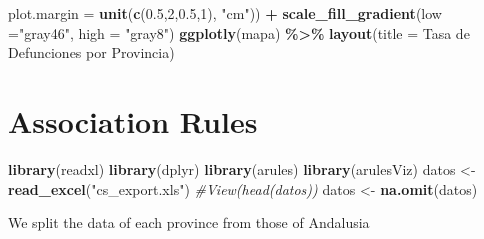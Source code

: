 \documentclass[
]{book}
\newenvironment{Shaded}{\begin{snugshade}}{\end{snugshade}}
\newcommand{\CommentTok}[1]{\textcolor[rgb]{0.56,0.35,0.01}{\textit{#1}}}
\newcommand{\DataTypeTok}[1]{\textcolor[rgb]{0.13,0.29,0.53}{#1}}
\newcommand{\DecValTok}[1]{\textcolor[rgb]{0.00,0.00,0.81}{#1}}
\newcommand{\FloatTok}[1]{\textcolor[rgb]{0.00,0.00,0.81}{#1}}
\newcommand{\KeywordTok}[1]{\textcolor[rgb]{0.13,0.29,0.53}{\textbf{#1}}}
\newcommand{\NormalTok}[1]{#1}
\newcommand{\OperatorTok}[1]{\textcolor[rgb]{0.81,0.36,0.00}{\textbf{#1}}}
\newcommand{\StringTok}[1]{\textcolor[rgb]{0.31,0.60,0.02}{#1}}
\begin{document}
\begin{Shaded}
\begin{Highlighting}[]
    \DataTypeTok{plot.margin =} \KeywordTok{unit}\NormalTok{(}\KeywordTok{c}\NormalTok{(}\FloatTok{0.5}\NormalTok{,}\DecValTok{2}\NormalTok{,}\FloatTok{0.5}\NormalTok{,}\DecValTok{1}\NormalTok{), }\StringTok{"cm"}\NormalTok{)) }\OperatorTok{+}
\StringTok{  }\KeywordTok{scale\_fill\_gradient}\NormalTok{(}\DataTypeTok{low =}\StringTok{"gray46"}\NormalTok{, }\DataTypeTok{high =} \StringTok{"gray8"}\NormalTok{)}
\KeywordTok{ggplotly}\NormalTok{(mapa) }\OperatorTok{\%\textgreater{}\%}\StringTok{  }
\StringTok{  }\KeywordTok{layout}\NormalTok{(}\DataTypeTok{title =} \StringTok{\textquotesingle{}Tasa de Defunciones por Provincia\textquotesingle{}}\NormalTok{)}
\end{Highlighting}
\end{Shaded}

\hypertarget{htmlwidget-a732c932f79a7ce8c7b1}{}

\hypertarget{association-rules}{%
\chapter{Association Rules}\label{association-rules}}

\begin{Shaded}
\begin{Highlighting}[]
\KeywordTok{library}\NormalTok{(readxl)}
\KeywordTok{library}\NormalTok{(dplyr)}
\KeywordTok{library}\NormalTok{(arules)}
\KeywordTok{library}\NormalTok{(arulesViz)}
\NormalTok{datos \textless{}{-}}\StringTok{ }\KeywordTok{read\_excel}\NormalTok{(}\StringTok{"cs\_export.xls"}\NormalTok{)}
\CommentTok{\#View(head(datos))}
\NormalTok{datos \textless{}{-}}\StringTok{ }\KeywordTok{na.omit}\NormalTok{(datos)}
\end{Highlighting}
\end{Shaded}

We split the data of each province from those of Andalusia

\begin{Shaded}
\end{Shaded}
\end{document}
